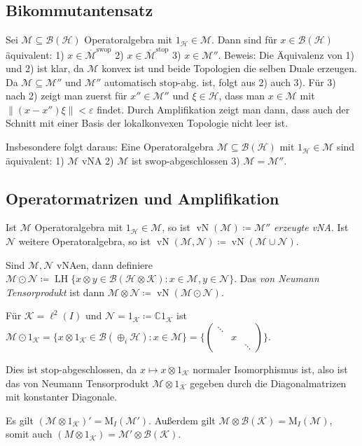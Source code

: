 \documentclass[11pt,a4paper]{scrartcl}
\newcommand{\C}{\mathbb{C}} %
\newcommand{\Hc}{\mathcal{H}}
\newcommand{\Kc}{\mathcal{K}}
\newcommand{\B}{\mathcal{B}}
\newcommand{\M}{\mathcal{M}}
\newcommand{\Nc}{\mathcal{N}}
\theoremstyle{plain}
\theoremstyle{definition}
\theoremstyle{remark}
\DeclareMathOperator{\LH}{LH}
\DeclareMathOperator{\vN}{vN}
\begin{document}
\subsection{Bikommutantensatz}

Sei $\M \subseteq \B(\Hc)$ Operatoralgebra mit $1_\Hc \in \M$. Dann sind für $x\in \B(\Hc)$ äquivalent: 1) $x\in \overline{\M}^\mathrm{swop}$ 2) $x\in \overline{\M}^\mathrm{stop}$ 3) $x\in \M''$. Beweis: Die Äquivalenz von 1) und 2) ist klar, da $\M$ konvex ist und beide Topologien die selben Duale erzeugen. Da $\M \subseteq \M''$ und $\M''$ automatisch $\mathrm{stop}$-abg. ist, folgt aus 2) auch 3). Für 3) nach 2) zeigt man zuerst für $x''\in \M''$ und $\xi\in \Hc$, dass man $x\in \M$ mit $\|(x-x'')\xi\| < \varepsilon$ findet. Durch Amplifikation zeigt man dann, dass auch der Schnitt mit einer Basis der lokalkonvexen Topologie nicht leer ist.

Insbesondere folgt daraus: Eine Operatoralgebra $\M\subseteq \B(\Hc)$ mit $1_\Hc\in \M$ sind äquivalent: 1) $\M$ vNA 2) $\M$ ist $\mathrm{swop}$-abgeschlossen 3) $\M=\M''$.

\subsection{Operatormatrizen und Amplifikation}

Ist $\M$ Operatoralgebra mit $1_\Hc\in \M$, so ist $\vN(\M)\coloneqq \M''$ \emph{erzeugte vNA}. Ist $\Nc$ weitere Operatoralgebra, so ist $\vN(\M,\Nc)\coloneqq \vN(\M\cup\Nc)$.

Sind $\M,\Nc$ vNAen, dann definiere $\M\odot\Nc\coloneqq \LH \{x\otimes y \in \B(\Hc\otimes \Kc): x\in \M, y\in \Nc \}$. Das \emph{von Neumann Tensorprodukt} ist dann $\M\otimes\Nc \coloneqq \vN(\M\odot \Nc)$.

Für $\Kc = \ell^2(I)$ und $\Nc=1_\Kc\coloneqq \C 1_\Kc$ ist $\M\odot 1_\Kc = \{ x\otimes 1_\Kc \in \B(\oplus_i \Hc): x\in \M \}=\{ \left( \begin{smallmatrix} \ddots & & \\ & x & \\ & & \ddots \end{smallmatrix} \right) \}$. 

Dies ist $\mathrm{stop}$-abgeschlossen, da $x\mapsto x\otimes 1_\Kc$ normaler Isomorphismus ist, also ist das von Neumann Tensorprodukt $\M\otimes 1_\Kc$ gegeben durch die Diagonalmatrizen mit konstanter Diagonale.

Es gilt $(\M\otimes 1_\Kc)'=\mathrm{M}_I(\M')$. Außerdem gilt $\M\otimes \B(\Kc)=\mathrm{M}_I(\M)$, somit auch $(M\otimes 1_\Kc)=\M'\otimes \B(\Kc)$.
\end{document}
